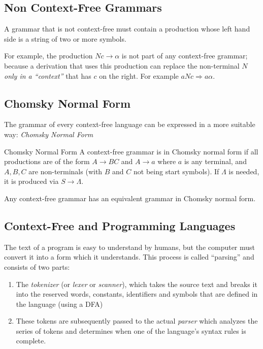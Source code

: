 \subsection{Non Context-Free Grammars}
A grammar that is not context-free must contain a production whose left hand side is a string of two or more symbols.

For example, the production $Nc \rightarrow \alpha$ is not part of any context-free grammar; because a derivation that uses this production can replace the non-terminal $N$ \textit{only in a ``context''} that has $c$ on the right. For example $aNc \Rightarrow a\alpha$. 

\subsection{Chomsky Normal Form}
The grammar of every context-free language can be expressed in a more suitable way: \textit{Chomsky Normal Form}

\begin{define}
\item[Chomsky Normal Form] A context-free grammar is in Chomsky normal form if all productions are of the form $A \rightarrow BC$ and $A \rightarrow a$ where $a$ is any terminal, and $A, B, C$ are non-terminals (with $B$ and $C$ not being start symbols). If $\Lambda$ is needed, it is produced via $S \rightarrow \Lambda$. 
\end{define}

Any context-free grammar has an equivalent grammar in Chomsky normal form. 

\subsection{Context-Free and Programming Languages}
The text of a program is easy to understand by humans, but the computer must convert it into a form which it understands. This process is called ``parsing'' and consists of two parts:
\begin{enumerate}
    \item The \textit{tokenizer} (or \textit{lexer} or \textit{scanner}), which takes the source text and breaks it into the reserved words, constants, identifiers and symbols that are defined in the language (using a DFA)
    \item These tokens are subsequently passed to the actual \textit{parser} which analyzes the series of tokens and determines when one of the language's syntax rules is complete.
\end{enumerate}

